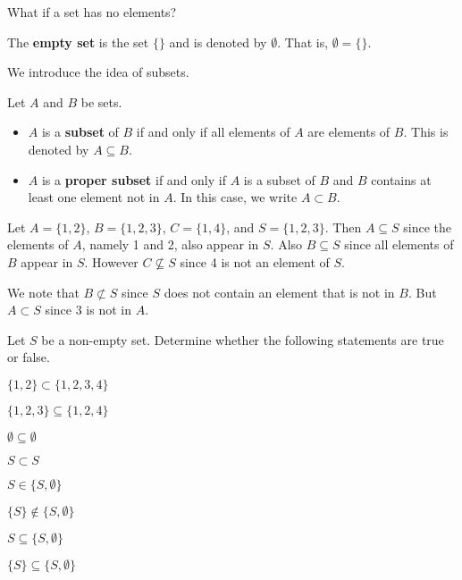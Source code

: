 What if a set has no elements?
\begin{definition}
    The \textbf{empty set} is the set $\{\}$ and is denoted by $\emptyset$. That is, $\emptyset = \{\}$.
\end{definition}

We introduce the idea of subsets.
\begin{definition}
    Let $A$ and $B$ be sets.
    \begin{itemize}
        \item $A$ is a \textbf{subset} of $B$ if and only if all elements of $A$ are elements of $B$. This is denoted by $A \subseteq B$.
        \item $A$ is a \textbf{proper subset} if and only if $A$ is a subset of $B$ and $B$ contains at least one element not in $A$. In this case, we write $A \subset B$.
    \end{itemize}
\end{definition}

\newpage

\begin{example}
    Let $A = \{1, 2\}$, $B = \{1, 2, 3\}$, $C = \{1, 4\}$, and $S = \{1, 2, 3\}$. Then $A \subseteq S$ since the elements of $A$, namely 1 and 2, also appear in $S$. Also $B \subseteq S$ since all elements of $B$ appear in $S$. However $C \not\subseteq S$ since 4 is not an element of $S$.

    We note that $B \not\subset S$ since $S$ does not contain an element that is not in $B$. But $A \subset S$ since 3 is not in $A$.
\end{example}

\begin{exercise}
    Let $S$ be a non-empty set. Determine whether the following statements are true or false.

    \begin{multicols}{2}
        \begin{partquestions}{\alph*}
            \item $\{1, 2\} \subset \{1, 2, 3, 4\}$
            \item $\{1, 2, 3\} \subseteq \{1, 2, 4\}$
            \item $\emptyset \subseteq \emptyset$
            \item $S \subset S$
            \item $S \in \{S, \emptyset\}$
            \item $\{S\} \notin \{S, \emptyset\}$
            \item $S \subseteq \{S, \emptyset\}$
            \item $\{S\} \subseteq \{S, \emptyset\}$
        \end{partquestions}
    \end{multicols}
\end{exercise}

